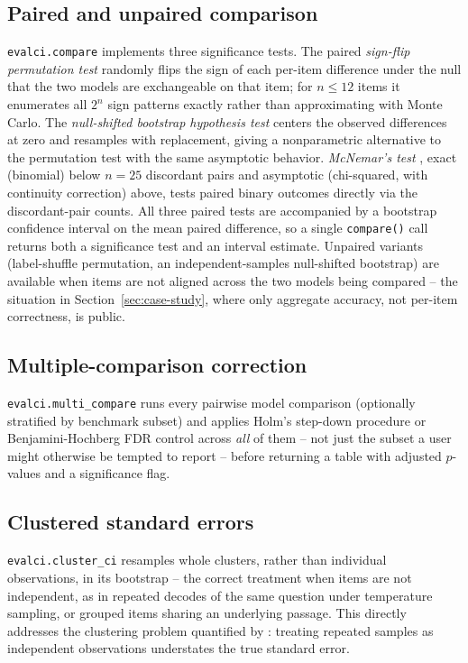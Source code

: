 \documentclass[11pt]{article}
\begin{document}
\subsection{Paired and unpaired comparison}
\texttt{evalci.compare} implements three significance tests. The paired
\emph{sign-flip permutation test} randomly flips the sign of each per-item
difference under the null that the two models are exchangeable on that item;
for $n\le12$ items it enumerates all $2^n$ sign patterns exactly rather than
approximating with Monte Carlo. The \emph{null-shifted bootstrap hypothesis
test} centers the observed differences at zero and resamples with
replacement, giving a nonparametric alternative to the permutation test with
the same asymptotic behavior. \emph{McNemar's test} \citep{mcnemar1947},
exact (binomial) below $n=25$ discordant pairs and asymptotic
(chi-squared, with continuity correction) above, tests paired binary outcomes
directly via the discordant-pair counts. All three paired tests are
accompanied by a bootstrap confidence interval on the mean paired difference,
so a single \texttt{compare()} call returns both a significance test and an
interval estimate. Unpaired variants (label-shuffle permutation, an
independent-samples null-shifted bootstrap) are available when items are not
aligned across the two models being compared -- the situation in
Section~\ref{sec:case-study}, where only aggregate accuracy, not per-item
correctness, is public.

\subsection{Multiple-comparison correction}
\texttt{evalci.multi\_compare} runs every pairwise model comparison
(optionally stratified by benchmark subset) and applies Holm's step-down
procedure \citep{holm1979} or Benjamini-Hochberg FDR control
\citep{benjaminihochberg1995} across \emph{all} of them -- not just the
subset a user might otherwise be tempted to report -- before returning a
table with adjusted $p$-values and a significance flag.

\subsection{Clustered standard errors}
\texttt{evalci.cluster\_ci} resamples whole clusters, rather than individual
observations, in its bootstrap -- the correct treatment when items are not
independent, as in repeated decodes of the same question under temperature
sampling, or grouped items sharing an underlying passage. This directly
addresses the clustering problem quantified by \citet{miller2024}: treating
repeated samples as independent observations understates the true standard
error.
\end{document}
